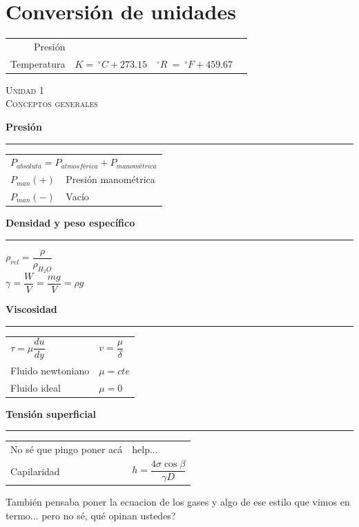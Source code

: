 \documentclass[11pt,a4paper]{article}
\newcommand{\unidad}[2]{\begin{center}
		\fontsize{10}{10}\selectfont\color{gray!50!black}\scshape Unidad #1 \\
		\fontsize{14}{14}\selectfont \scshape #2
	\end{center} \vspace{-.6cm}}
\newcommand{\subtitulo}[1]{
	\textbf{#1} \\ \vspace{.1cm} {\color{gray} \hrule} \vspace{.2cm}
}
\newcommand{\grado}{^\circ}
\begin{document}
	\section*{Conversión de unidades}
		\begin{tabular}{r l r l}
			Presión & & & \\
			Temperatura & $K =\ \grado C + 273.15$ & $ \grado R\ =\ \grado F + 459.67$ & \\
		\end{tabular}
	\unidad{1}{Conceptos generales}
		\begin{cajita}
			\centering
			\begin{multicols}{2}
				\subtitulo{Presión \vspace{.085cm}}
				\begin{tabular}{l l}
					\multicolumn{2}{c}{$P_{absoluta} = P_{atmosférica} + P_{manométrica}$\vspace{.1cm}}\\
					$P_{man} (+)$ & Presión manométrica\vspace{.1cm} \\
					$P_{man} (-)$ & Vacío \\
				\end{tabular}
				\columnbreak
				
				\subtitulo{Densidad y peso específico}
				$\rho_{rel} = \dfrac{\rho}{\rho_{H_2O}}$\vspace{.1cm}\\
				$\gamma = \dfrac{W}{V} = \dfrac{mg}{V} = \rho g$\\
			\end{multicols}
			
			\begin{multicols}{2}
				\subtitulo{Viscosidad\vspace{.08cm}}
				\begin{tabular}{l l}
					$\tau = \mu \dfrac{du}{dy}$ & $v = \dfrac{\mu}{\delta}$\\
					Fluido newtoniano & $\mu = cte$ \\
					Fluido ideal & $\mu = 0$
				\end{tabular}
			
			\columnbreak
			
				\subtitulo{Tensión superficial}
				\begin{tabular}{l l}
					No sé que pingo poner acá & help...\\
					Capilaridad & $h = \dfrac{4 \sigma \cos \beta}{\gamma D}$
				\end{tabular}
			\end{multicols}
		
		También pensaba poner la ecuacion de los gases y algo de ese estilo que vimos en termo... pero no sé, qué opinan ustedes?
			
		\end{cajita}
	
\end{document}

